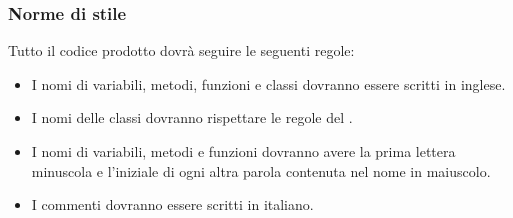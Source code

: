 \subsubsection{Norme di stile}
Tutto il codice prodotto dovrà seguire le seguenti regole:
\begin{itemize}
	\item I nomi di variabili, metodi, funzioni e classi dovranno essere scritti in inglese.
	\item I nomi delle classi dovranno rispettare le regole del .
	\item I nomi di variabili, metodi e funzioni dovranno avere la prima lettera minuscola e l'iniziale di ogni altra parola contenuta nel nome in maiuscolo.
	\item I commenti dovranno essere scritti in italiano.
\end{itemize}